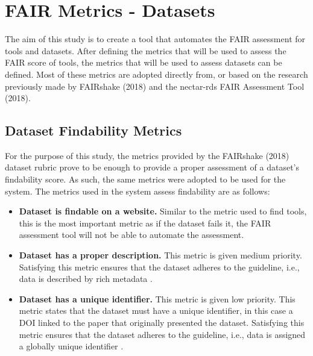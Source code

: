 \documentclass{cisfyp}
\begin{document}
\section{FAIR Metrics - Datasets}
The aim of this study is to create a tool that automates the FAIR assessment for tools and datasets. After defining the metrics that will be used to assess the FAIR score of tools, the metrics that will be used to assess datasets can be defined. Most of these metrics are adopted directly from, or based on the research previously made by FAIRshake (2018) and the nectar-rds FAIR Assessment Tool (2018).

\subsection{Dataset Findability Metrics}
For the purpose of this study, the metrics provided by the FAIRshake (2018) dataset rubric prove to be enough to provide a proper assessment of a dataset's findability score. As such, the same metrics were adopted to be used for the system.\newline
The metrics used in the system assess findability are as follows:
\begin{itemize}
	\item \textbf{Dataset is findable on a website.}\newline
	Similar to the metric used to find tools, this is the most important metric as if the dataset fails it, the FAIR assessment tool will not be able to automate the assessment.
	
	\item \textbf{Dataset has a proper description.}\newline
	This metric is given medium priority. Satisfying this metric ensures that the dataset adheres to the guideline, i.e., data is described by rich metadata \cite{Wilkinson2016}.
	
	\item \textbf{Dataset has a unique identifier.}\newline
	This metric is given low priority. This metric states that the dataset must have a unique identifier, in this case a DOI linked to the paper that originally presented the dataset. Satisfying this metric ensures that the dataset adheres to the guideline, i.e., data is assigned a globally unique identifier \cite{Wilkinson2016}.
\end{itemize}
\pagebreak
\end{document}

